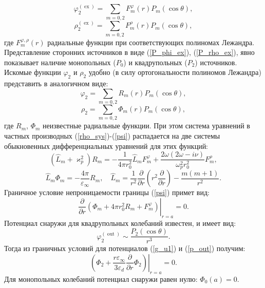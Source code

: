\documentclass[12pt, a4paper]{article}
\def \eps {\varepsilon}
\def \w {\omega}
\def \ph {\varphi}
\def \kp { \varkappa}
\def \ex { \operatorname{ex}}
\def \out { \operatorname{out}}
\begin{document}
\begin{equation}
	\label{P_phi_ex} 	
	\ph^{(\ex)}_2 =\sum_{m=0,2} F_m^\ph(r)P_m(\cos\theta),
\end{equation}
\begin{equation} 
	\label{P_rho_ex} 	
	\rho^{(\ex)}_2 =\sum_{m=0,2} F_m^\rho(r)P_m(\cos\theta),
\end{equation}
где $F_{m}^{\ph,\rho}(r)$ радиальные функции при соответствующих полиномах
Лежандра. Представление сторонних источников в виде (\ref{P_phi_ex}), (\ref{P_rho_ex}), явно
показывает наличие монопольных ($P_0$) и квадрупольных ($P_2$) источников. Искомые функции $\ph_2$ и $\rho_2$ удобно (в силу ортогональности полиномов Лежандра) представить в аналогичном виде:
\begin{equation} 	
	\ph_2 =\sum_{m=0,2} R_m(r)P_m(\cos\theta),
\end{equation}
\begin{equation} 	
	\rho_2 =\sum_{m=0,2} \Phi_m(r)P_m(\cos\theta),
\end{equation}
где $R_{m}$, $\Phi_{m}$ неизвестные радиальные функции. При этом система уравнений в частных производных (\ref{rho_sys})-(\ref{psi}) распадается на две системы обыкновенных дифференциальных уравнений для этих функций:
\begin{equation}
	\label{P_sys1}  	
	(\hat L_m + \kp_p^2) R_m = -\frac{1}{4 \pi r_0^2}\hat L_m F_m^\ph  + \frac{2\w(2\w - i \nu)}{\w_p^2r_0^2}F_m^\rho,
\end{equation}
\begin{equation} 
	\label{P_sys2} 	
	\hat L_m \Phi_m = -\frac{4\pi}{\eps_\infty}R_m,  \quad \hat{L}_m = \frac{1}{r^2} \frac{\partial}{\partial r} \left( r^2 \frac{\partial}{\partial r} \right) - \frac{m(m+1)}{r^2}.
\end{equation}
Граничное условие непроницаемости границы (\ref{psi}) примет вид:
\begin{equation}
	\left.\frac{\partial}{\partial r} \left( \Phi_m + 4\pi r_0^2 R_m + F_m^{\varphi} \right) \right|_{r=a} = 0.
\end{equation}
Потенциал снаружи для квадрупольных колебаний известен, и имеет вид:
\begin{equation}
	\varphi_2^{(\out)} \sim \frac{ P_2 (\cos \theta)}{r^3}.
	\label{p_out}
\end{equation}
Тогда из граничных условий для потенциалов (\ref{g_u1}) и (\ref{p_out}) получим:
\begin{equation}
	\left.\left( \Phi_2 + \frac{r\varepsilon_\infty}{3\varepsilon_d} \frac{\partial}{\partial r} \Phi_2 \right) \right|_{r=a} = 0.
	\label{eq:potential_condition}
\end{equation}
Для монопольных колебаний потенциал снаружи равен нулю: $\Phi_0(a) = 0.$
	
\end{document}
